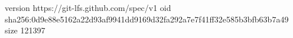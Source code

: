 version https://git-lfs.github.com/spec/v1
oid sha256:0d9e88e5162a22d93af9941dd9169d32fa292a7e7f41ff32e585b3bfb63b7a49
size 121397
